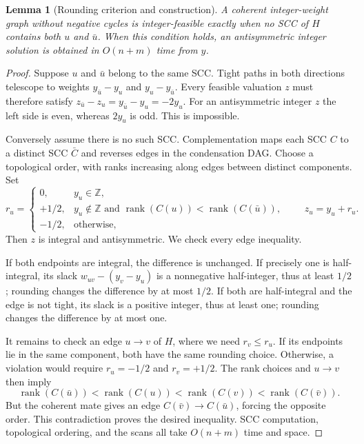 \documentclass[manuscript,11pt,screen,nonacm]{acmart}
\newtheorem{lemma}[theorem]{Lemma}
\theoremstyle{definition}
\newcommand{\Z}{\mathbb Z}
\DeclareMathOperator{\rank}{rank}
\begin{document}
\begin{lemma}[Rounding criterion and construction]\label{lem:rounding}
A coherent integer-weight graph without negative cycles is integer-feasible exactly when no SCC of $H$ contains both $u$ and $\bar u$. When this condition holds, an antisymmetric integer solution is obtained in $O(n+m)$ time from $y$.
\end{lemma}
\begin{proof}
Suppose $u$ and $\bar u$ belong to the same SCC. Tight paths in both directions telescope to weights $y_{\bar u}-y_u$ and $y_u-y_{\bar u}$. Every feasible valuation $z$ must therefore satisfy $z_{\bar u}-z_u=y_{\bar u}-y_u=-2y_u$. For an antisymmetric integer $z$ the left side is even, whereas $2y_u$ is odd. This is impossible.

Conversely assume there is no such SCC. Complementation maps each SCC $C$ to a distinct SCC $\bar C$ and reverses edges in the condensation DAG. Choose a topological order, with ranks increasing along edges between distinct components. Set
\[
 r_u=\begin{cases}
 0,&y_u\in\Z,\\
 +1/2,&y_u\notin\Z\text{ and }\rank(C(u))<\rank(C(\bar u)),\\
 -1/2,&\text{otherwise},
 \end{cases}
 \qquad z_u=y_u+r_u.
\]
Then $z$ is integral and antisymmetric. We check every edge inequality.

If both endpoints are integral, the difference is unchanged. If precisely one is half-integral, its slack $w_{uv}-(y_v-y_u)$ is a nonnegative half-integer, thus at least $1/2$; rounding changes the difference by at most $1/2$. If both are half-integral and the edge is not tight, its slack is a positive integer, thus at least one; rounding changes the difference by at most one.

It remains to check an edge $u\to v$ of $H$, where we need $r_v\leq r_u$. If its endpoints lie in the same component, both have the same rounding choice. Otherwise, a violation would require $r_u=-1/2$ and $r_v=+1/2$. The rank choices and $u\to v$ then imply
\[
 \rank(C(\bar u))<\rank(C(u))<\rank(C(v))<\rank(C(\bar v)).
\]
But the coherent mate gives an edge $C(\bar v)\to C(\bar u)$, forcing the opposite order. This contradiction proves the desired inequality. SCC computation, topological ordering, and the scans all take $O(n+m)$ time and space.
\end{proof}
\end{document}
